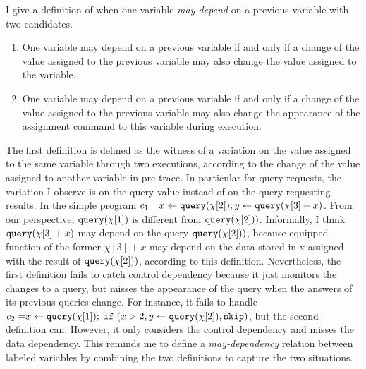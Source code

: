 I give a definition of when one variable \emph{may-depend} on a previous variable with two candidates.
{
\begin{enumerate}
    \item One variable may depend on a previous variable if and only if a change of the value assigned to the previous variable may also change the value assigned to the variable.
    \item One variable may depend on a previous variable if and only if a change of the value assigned to the previous variable may also change the appearance of the assignment command to this variable 
    during execution.
\end{enumerate}
}

{   
The first definition is defined as
the witness of a variation on the value assigned to the same variable through two executions,
according to the change of the value assigned to another variable in pre-trace.
In particular for query requests, the variation I observe is on the query value instead of on the query requesting results.
In 
the simple program $c_1 =\mathrel{ x \leftarrow {\tt query}(\chi[2]) } ;\mathrel{ y \leftarrow {\tt query}(\chi[3] + x) }$.
 From our perspective, ${\tt query}(\chi[1])$ is different from ${\tt query}(\chi[2]))$. Informally, I think ${\tt query}(\chi[3] + x)$ may depend on the query ${\tt query}(\chi[2]))$, because equipped function of the former $\chi[3] + x$ may depend on the data stored in x assigned with the result of ${\tt query}(\chi[2]))$, according to this definition. }
%
Nevertheless, the first definition fails to catch control dependency because it just monitors the changes to a query, but misses the appearance of the query when the answers of its previous queries change. 
For instance, it fails to handle $
      c_2 = \mathrel{ x \leftarrow {\tt query}(\chi[1]) } ; \;\mathtt{if}\;( x > 2 , \mathrel{ y \leftarrow {\tt query}(\chi[2]) }, \mathtt{skip} )
   $, but the second definition can. However, it only considers the control dependency and misses the data dependency. 
  This reminds me to define a \emph{may-dependency} relation between labeled variables by combining the two definitions to capture the two situations.
%
%
%
